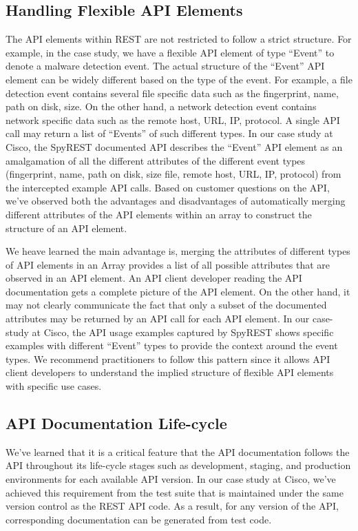 \documentclass[10pt, conference]{IEEEtran}
\begin{document}
\subsection{Handling Flexible API Elements}
The API elements within REST are not restricted to follow a strict structure. For example, in the case study, we have a flexible API element of type ``Event'' to denote a malware detection event. The actual structure of the ``Event'' API element can be widely different based on the type of the event. For example, a file detection event contains several file specific data such as the fingerprint, name, path on disk, size. On the other hand, a network detection event contains network specific data such as the remote host, URL, IP, protocol. A single API call may return a list of ``Events'' of such different types. In our case study at Cisco, the SpyREST documented API describes the ``Event'' API element as an amalgamation of all the different attributes of the different event types (fingerprint, name, path on disk, size file, remote host, URL, IP, protocol) from the intercepted example API calls. Based on customer questions on the API, we've observed both the advantages and disadvantages of automatically merging different attributes of the API elements within an array to construct the structure of an API element.

We heave learned the main advantage is, merging the attributes of different types of API elements in an Array provides a list of all possible attributes that are observed in an API element. An API client developer reading the API documentation gets a complete picture of the API element. On the other hand, it may not clearly communicate the fact that only a subset of the documented attributes may be returned by an API call for each API element. In our case-study at Cisco, the API usage examples captured by SpyREST shows specific examples with different ``Event'' types to provide the context around the event types. We recommend practitioners to follow this pattern since it allows API client developers to understand the implied structure of flexible API elements with specific use cases.


\subsection{API Documentation Life-cycle}
We've learned that it is a critical feature that the API documentation follows the API throughout its life-cycle stages such as development, staging, and production environments for each available API version. In our case study at Cisco, we've achieved this requirement from the test suite that is maintained under the same version control as the REST API code. As a result, for any version of the API, corresponding documentation can be generated from test code.
\end{document}
